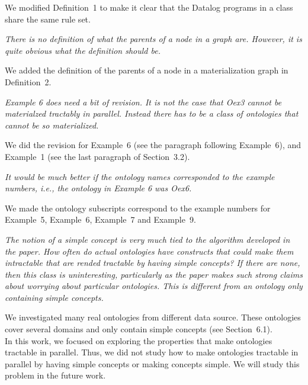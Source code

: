 \documentclass{article}
\let\quoteOld\quote
\let\endquoteOld\endquote
\renewenvironment{quote}{\quoteOld\itshape}{\endquoteOld}
\begin{document}
We modified Definition~1 to make it clear that the Datalog programs
in a class share the same rule set.

\begin{quote}
There is no definition of what the parents of a node in a graph are.
However, it is quite obvious what the definition should be.
\end{quote}

We added the definition of the parents of a node in a materialization graph in Definition~2.

\begin{quote}
Example 6 does need a bit of revision.  It is not the case that Oex3 cannot
be materialzed tractably in parallel.  Instead there has to be a class of
ontologies that cannot be so materialized.
\end{quote}

We did the revision for Example~6 (see the paragraph following Example~6),
and Example~1 (see the last paragraph of Section~3.2).


\begin{quote}
It would be much better if the ontology names corresponded to the example
numbers, i.e., the ontology in Example 6 was Oex6.
\end{quote}

We made the ontology subscripts correspond to the example numbers
for Example~5, Example~6, Example~7 and Example~9.


\begin{quote}
The notion of a simple concept is very much tied to the algorithm developed
in the paper.  How often do actual ontologies have constructs that could
make them intractable that are rended tractable by having simple concepts?
If there are none, then this class is uninteresting, particularly as the
paper makes such strong claims about worrying about particular ontologies.
This is different from an ontology only containing simple concepts.
\end{quote}


We investigated many real ontologies from different data source. These ontologies cover
several domains and only contain simple concepts (see Section~6.1). \\

In this work, we focused on exploring the properties
that make ontologies tractable in parallel. Thus, we did not study how to make ontologies
tractable in parallel by having simple concepts or making concepts simple.
We will study this problem in the future work.
\end{document}
